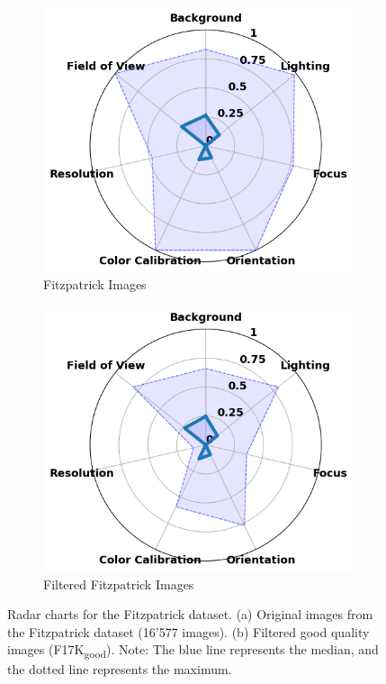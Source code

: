 \begin{figure}[ht]
    \centering
    \begin{subfigure}[b]{0.45\textwidth}
        \includegraphics[width=\textwidth]{img/hept/Fitzpatrick17k.png}
        \caption{Fitzpatrick Images}
        \label{fig:Fitzpatrick17K}
    \end{subfigure}
    \hfill
    \begin{subfigure}[b]{0.45\textwidth}
        \includegraphics[width=\textwidth]{img/hept/F17K.png}
        \caption{Filtered Fitzpatrick Images}
        \label{fig:F17K}
    \end{subfigure}
    \hfill
    \caption{Radar charts for the Fitzpatrick dataset. (a) Original images from the Fitzpatrick dataset (16'577 images). (b) Filtered good quality images (F17K\textsubscript{good}). Note: The blue line represents the median, and the dotted line represents the maximum.}
    \label{fig:FF}
\end{figure}
\vspace{\baselineskip}

